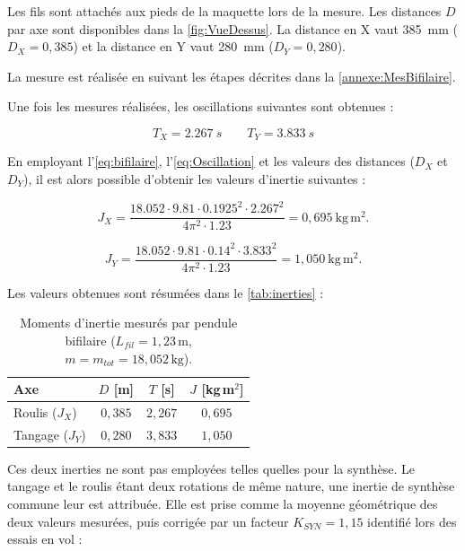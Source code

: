 Les fils sont attachés aux pieds de la maquette lors de la mesure. Les distances $D$ par axe sont disponibles dans la \autoref{fig:VueDessus}. La distance en X vaut 385~mm ($D_X = 0{,}385$) et la distance en Y vaut 280~mm ($D_Y = 0{,}280$).

La mesure est réalisée en suivant les étapes décrites dans la \autoref{annexe:MesBifilaire}.

Une fois les mesures réalisées, les oscillations suivantes sont obtenues :

\begin{equation}
    T_X = 2.267~s \qquad T_Y = 3.833~s
    \label{eq:Oscillation}
\end{equation}

En employant l'\autoref{eq:bifilaire}, l'\autoref{eq:Oscillation} et les valeurs des distances ($D_X$ et $D_Y$), il est alors possible d'obtenir les valeurs d'inertie suivantes :

\begin{equation}
    J_X = \frac{18.052 \cdot 9.81 \cdot 0.1925^2 \cdot 2.267^2}
    {4\pi^2 \cdot 1.23}
    = 0{,}695\ \mathrm{kg\,m^2}.
\end{equation}

\begin{equation}
    J_Y = \frac{18.052 \cdot 9.81 \cdot 0.14^2 \cdot 3.833^2}
    {4\pi^2 \cdot 1.23}
    = 1{,}050\ \mathrm{kg\,m^2}.
\end{equation}

Les valeurs obtenues sont résumées dans le \autoref{tab:inerties} :

\begin{table}[H]
    \centering
    \begin{tabular}{lccc}
        \toprule
        \textbf{Axe}    & \textbf{$D$ [m]} & \textbf{$T$ [s]} & \textbf{$J$ [kg\,m$^2$]} \\
        \midrule
        Roulis ($J_X$)  & $0{,}385$        & $2{,}267$        & $0{,}695$                \\
        Tangage ($J_Y$) & $0{,}280$        & $3{,}833$        & $1{,}050$                \\
        \bottomrule
    \end{tabular}
    \caption{Moments d'inertie mesurés par pendule bifilaire ($L_{fil} = 1{,}23\,\mathrm{m}$, $m = m_{tot} = 18{,}052\,\mathrm{kg}$).}
    \label{tab:inerties}
\end{table}

Ces deux inerties ne sont pas employées telles quelles pour la synthèse. Le tangage et le roulis étant deux rotations de même nature, une inertie de synthèse commune leur est attribuée. Elle est prise comme la moyenne géométrique des deux valeurs mesurées, puis corrigée par un facteur $K_{SYN} = 1{,}15$ identifié lors des essais en vol :

